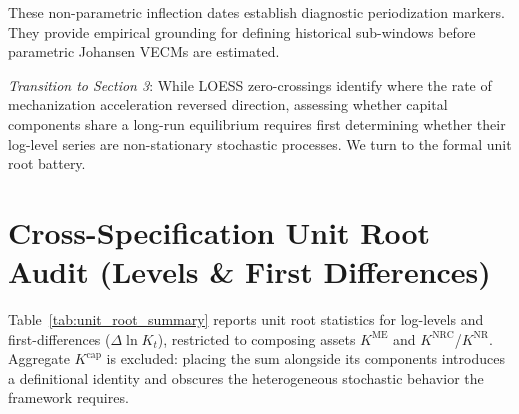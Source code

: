 \documentclass[11pt,a4paper]{article}
\begin{document}
These non-parametric inflection dates establish diagnostic periodization markers. They provide empirical grounding for defining historical sub-windows before parametric Johansen VECMs are estimated.

\textit{Transition to Section 3}: While LOESS zero-crossings identify where the rate of mechanization acceleration reversed direction, assessing whether capital components share a long-run equilibrium requires first determining whether their log-level series are non-stationary stochastic processes. We turn to the formal unit root battery.

\FloatBarrier
\section{Cross-Specification Unit Root Audit (Levels \& First Differences)}

Table~\ref{tab:unit_root_summary} reports unit root statistics for log-levels and first-differences ($\Delta \ln K_t$), restricted to composing assets $K^{\text{ME}}$ and $K^{\text{NRC}}$/$K^{\text{NR}}$. Aggregate $K^{\text{cap}}$ is excluded: placing the sum alongside its components introduces a definitional identity and obscures the heterogeneous stochastic behavior the framework requires.
\end{document}
